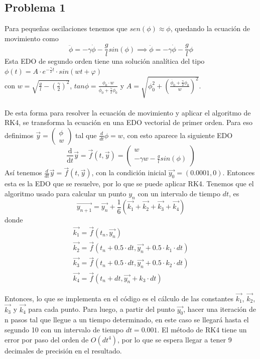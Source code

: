 \documentclass[letterpaper,oneside]{article}
\begin{document}
\subsection{Problema 1}
Para pequeñas oscilaciones tenemos que $sen(\phi)\approx \phi$, quedando la ecuación de movimiento como
$$\ddot{\phi}=-\gamma \dot{\phi}-\frac{g}{l}sin(\phi) \implies \ddot{\phi}=-\gamma \dot{\phi}-\frac{g}{l}\phi$$
Esta EDO de segundo orden tiene una solución analítica del tipo
$\phi(t)= A\cdot e^{-\frac{\gamma}{2}t}\cdot sin(wt+\varphi) $\\ 
con $w=\sqrt{\frac{g}{l}-\left (\frac{\gamma}{2}  \right )^2}$, 
$tan\phi=\frac{\phi_0\cdot w}{\dot{\phi_0}+\frac{\gamma}{2}\phi_0}$ y     $A=\sqrt{\phi_0^2+\left ( \frac{\dot{\phi_0}+\frac{\gamma}{2}\phi_0}{w} \right )^2}$.
\\ \\
De esta forma para resolver la ecuación de movimiento y aplicar el algoritmo de RK4, se transforma la ecuación en una EDO vectorial de primer orden. Para eso definimos $\vec{y}=\begin{pmatrix}
\phi \\ w\end{pmatrix}$ tal que $\frac{d}{dt}\phi=w$, con esto aparece la siguiente EDO $$\frac{\mathrm{d} }{\mathrm{d} t}\vec{y}=\vec{f}(t,\vec{y})=\begin{pmatrix}
w \\ -\gamma w-\frac{g}{l}sin(\phi)
\end{pmatrix}$$
Así tenemos $\frac{d}{dt}\vec{y}=\vec{f}(t,\vec{y})$, con la condición inicial $\vec{y_0}=(0.0001, 0)$. Entonces esta es la EDO que se resuelve, por lo que se puede aplicar RK4. Tenemos que el algoritmo usado para calcular un punto $y_n$ con un intervalo de tiempo $dt$, es
$$\vec{y_{n+1}}=\vec{y_n}+\frac{1}{6}(\vec{k_1}+\vec{k_2}+\vec{k_3}+\vec{k_4}) $$
donde $$\begin{matrix} 
\vec{k_1}=\vec{f}(t_n,\vec{y_n})\\ 
\vec{k_2}=\vec{f}(t_n+0.5\cdot dt, \vec{y_n}+0.5\cdot k_1\cdot dt)\\ 
\vec{k_3}=\vec{f}(t_n+0.5\cdot dt, \vec{y_n}+0.5\cdot k_2\cdot dt)\\ 
\vec{k_4}=\vec{f}(t_n+ dt, \vec{y_n}+k_3\cdot dt)
\end{matrix}$$

Entonces, lo que se implementa en el código es el cálculo de las constantes $\vec{k_1}$, $\vec{k_2}$, $\vec{k_3}$ y $\vec{k_4}$ para cada punto. Para luego, a partir del punto $\vec{y_0}$,  hacer una iteración de n pasos tal que llegue a un tiempo determinado, en este caso se llegará hasta el segundo 10 con un intervalo de tiempo $dt=0.001$. El método de RK4 tiene un error por paso del orden de $O(dt^4)$, por lo que se espera llegar a tener 9 decimales de precisión en el resultado.
\end{document}
